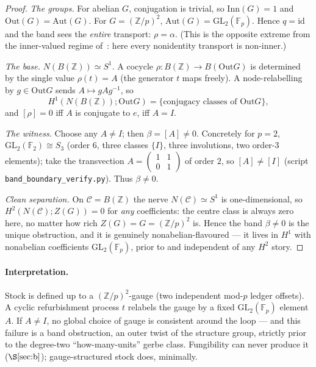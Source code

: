 \documentclass[11pt]{article}
\theoremstyle{definition}
\newcommand{\C}{\mathcal{C}}
\newcommand{\id}{\mathrm{id}}
\newcommand{\Z}{\mathbb{Z}}
\newcommand{\Aut}{\mathrm{Aut}}
\newcommand{\Inn}{\mathrm{Inn}}
\newcommand{\Out}{\mathrm{Out}}
\newcommand{\GL}{\mathrm{GL}}
\begin{document}
\begin{proof}
\emph{The groups.} For abelian $G$, conjugation is trivial, so $\Inn(G)=1$ and $\Out(G)=\Aut(G)$. For
$G=(\Z/p)^2$, $\Aut(G)=\GL_2(\mathbb F_p)$. Hence $q=\id$ and the band sees the \emph{entire}
transport: $\rho=\alpha$. (This is the opposite extreme from the inner-valued regime
of~\cite{gerbenote}: here every nonidentity transport is non-inner.)

\emph{The base.} $N(B(\Z))\simeq S^1$. A cocycle $\rho:B(\Z)\to B(\Out G)$ is determined by the single
value $\rho(t)=A$ (the generator $t$ maps freely). A node-relabelling by $g\in\Out G$ sends
$A\mapsto gAg^{-1}$, so
\[
H^1(N(B(\Z));\Out G)=\{\text{conjugacy classes of }\Out G\},
\]
and $[\rho]=0$ iff $A$ is conjugate to $e$, iff $A=I$.

\emph{The witness.} Choose any $A\neq I$; then $\beta=[A]\neq0$. Concretely for $p=2$,
$\GL_2(\mathbb F_2)\cong S_3$ (order $6$, three classes $\{I\}$, three involutions, two order-$3$
elements); take the transvection $A=\left(\begin{smallmatrix}1&1\\0&1\end{smallmatrix}\right)$ of
order $2$, so $[A]\neq[I]$ (script \texttt{band\_boundary\_verify.py}). Thus $\beta\neq0$.

\emph{Clean separation.} On $\C=B(\Z)$ the nerve $N(\C)\simeq S^1$ is one-dimensional, so
$H^2(N(\C);Z(G))=0$ for \emph{any} coefficients: the centre class is always zero here, no matter how
rich $Z(G)=G=(\Z/p)^2$ is. Hence the band $\beta\neq0$ is the unique obstruction, and it is genuinely
nonabelian-flavoured --- it lives in $H^1$ with nonabelian coefficients $\GL_2(\mathbb F_p)$, prior to
and independent of any $H^2$ story.
\end{proof}

\paragraph{Interpretation.} Stock is defined up to a $(\Z/p)^2$-gauge (two independent mod-$p$ ledger
offsets). A cyclic refurbishment process $t$ relabels the gauge by a fixed $\GL_2(\mathbb F_p)$ element
$A$. If $A\neq I$, no global choice of gauge is consistent around the loop --- and this failure is a
band obstruction, an outer twist of the structure group, strictly prior to the degree-two
``how-many-units'' gerbe class. Fungibility can never produce it ($\S\ref{sec:b}$); gauge-structured
stock does, minimally.
\end{document}
